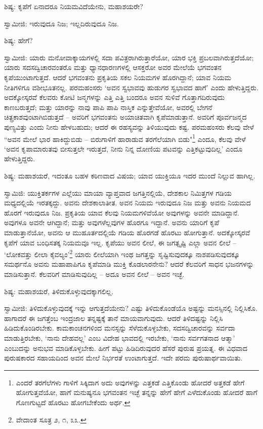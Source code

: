 ಶಿಷ್ಯ: ಕೃಪೆಗೆ ಏನಾದರೂ ನಿಯಮವಿದೆಯೇನು, ಮಹಾಶಯರೇ?

ಸ್ವಾಮೀಜಿ: ಇರುವುದೂ ನಿಜ; ಇಲ್ಲದಿರುವುದೂ ನಿಜ.

ಶಿಷ್ಯ: ಹೇಗೆ?

ಸ್ವಾಮೀಜಿ: ಯಾರು ಮನೋವಾಕ್ಕಾಯಗಳಲ್ಲಿ ಸದಾ ಪವಿತ್ರರಾಗಿರುತ್ತಾರೆಯೋ, ಯಾರ ಭಕ್ತಿ ಪ್ರಬಲವಾಗಿರುತ್ತದೆಯೋ; ಯಾರು ಸದಸದ್ವಿಚಾರವಂತರೊ ಮತ್ತು ಧ್ಯಾನಧಾರಣಗಳಲ್ಲಿ ಆಸಕ್ತರೋ ಅವರ ಮೇಲೆಯೆ ಭಗವಂತನ ಕೃಪೆಯುಂಟಾಗುತ್ತದೆ. ಆದರೆ ಭಗವಂತನು ಪ್ರಕೃತಿಯ ಸಕಲ ನಿಯಮಗಳ ಹೊರಗಿದ್ದಾನೆ; ಯಾವ ನಿಯಮ ನೀತಿಗಳಿಗೂ ವಶೀಭೂತನಲ್ಲ. ಪರಮಹಂಸರು ‘ಅವನ ಸ್ವಭಾವವು ಹುಡುಗರ ಸ್ವಭಾವದ ಹಾಗೆ’ ಎಂದು ಹೇಳುತ್ತಿದ್ದರು. ಅದಕ್ಕೋಸ್ಕರವೆ ಕೆಲವರು ಕೋಟಿ ಜನ್ಮಗಳನ್ನು ಎತ್ತಿ ಎತ್ತಿ ಬಂದರೂ ಅವನ ಸುಳಿವೆ ಗೊತ್ತಾಗದಿರುವುದು ಕಾಣಬರುತ್ತದೆ; ಮತ್ತು ಯಾರನ್ನು ನಾವು ಪಾಪಿ ಪಾಪಿ ನಾಸ್ತಿಕ ಎನ್ನುತ್ತೇವೆಯೋ, ಅವರಲ್ಲಿ ಬೇಗನೆ ಚಿತ್ಪ್ರಕಾಶವುಂಟಾಗಿಬಿಡುತ್ತದೆ – ಅವರಿಗೆ ಭಗವಂತನು ಅಯಾಚಿತವಾಗಿ ಕೃಪೆಮಾಡುತ್ತಾನೆ. ಅವರಿಗೆ ಪೂರ್ವಜನ್ಮದ ಪುಣ್ಯವಿತ್ತು ಎಂದು ನೀನು ಹೇಳಬಹುದು; ಆದರೆ ಈ ರಹಸ್ಯವನ್ನು ತಿಳಿಯುವುದು ಕಷ್ಟ. ಪರಮಹಂಸರು ಕೆಲವು ವೇಳೆ “ಅವನ ಮೇಲೆ ಭಾರ ಹಾಕಿದ್ದುಬಿಡು – ಬಿರುಗಾಳಿಗೆ ಹಾರಾಡುವ ತರಗೆಲೆಯಾಗಿ ಬಿಡು"\footnote{ಎಂದರೆ ತರಗೆಲೆಗಳು ಗಾಳಿಗೆ ಸಿಕ್ಕಿದಾಗ ಅದು ಅವುಗಳನ್ನು ಎತ್ತಕಡೆ ಎತ್ತಿಕೊಂಡು ಹೋದರೆ ಅತ್ತಕಡೆ ಹೇಗೆ ಹೋಗುತ್ತವೆಯೋ, ಹಾಗೆ ಮನುಷ್ಯನೂ ಭಗವಂತನ ಇಚ್ಛೆ ತನ್ನನ್ನು ಹೇಗೆ ಹೇಗೆ ಎಳೆದುಕೊಂಡು ಹೋದರೆ ಹಾಗೆ ಗೊಣಗುಟ್ಟದೆ ಹೊರಟು ಹೋಗಬೇಕೆಂದು ಅರ್ಥ.} ಎಂದೂ, ಕೆಲವು ವೇಳೆ ‘ಅವನ ಕೃಪಾಮಾರುತವು ಬೀಸುತ್ತಲೇ ಇರುತ್ತದೆ, ನೀನು ನಿನ್ನ ದೋಣಿಯ ಪಟವನ್ನು ಎತ್ತಿಕಟ್ಟುವುದಿಲ್ಲ’ ಎಂದೂ ಹೇಳುತ್ತಿದ್ದರು.

ಶಿಷ್ಯ: ಮಹಾಶಯರೆ, ಇದಂತೂ ಬಹಳ ಕಠಿಣವಾದ ವಿಷಯ; ಯಾವ ಯುಕ್ತಿಯೂ ಇದರ ಮುಂದೆ ನಿಲ್ಲುವ ಹಾಗಿಲ್ಲ.

ಸ್ವಾಮಿಜಿ: ಯುಕ್ತಿತರ್ಕಗಳ ಎಲ್ಲೆಯು ಮಾಯಾ ವ್ಯಾಪ್ತವಾದ ಜಗತ್ತಿನಲ್ಲಿಯೆ, ದೇಶಕಾಲ ನಿಮಿತ್ತಗಳ ಗಡಿಯ ಮಧ್ಯದಲ್ಲಿಯೆ ಇರತಕ್ಕದ್ದು. ಅವನು ದೇಶಕಾಲಾತೀತ. ಅವನ ನಿಯಮ ಇರುವುದೂ ನಿಜ ಮತ್ತು ಅವನು ನಿಯಮದ ಹೊರಗೆ ಇರುವುದೂ ನಿಜ. ಪ್ರಕೃತಿಯ ಯಾವ ಕೆಲವು ನಿಯಮಗಳಿವೆಯೋ ಅವುಗಳನ್ನು ಅವನೇ ಮಾಡಿದ್ದಾನೆ. ಅವುಗಳೂ ಅವನೇ ಆಗಿದ್ದಾನೆ; ಮತ್ತು ಅವುಗಳೆಲ್ಲವುಗಳ ಹೊರಗೂ ಇದ್ದಾನೆ. ಅವನು ಯಾರಿಗೆ ಕೃಪೆ ಮಾಡುತ್ತಾನೆಯೋ, ಅವನು ಆ ಮುಹೂರ್ತದಲ್ಲಿಯೆ ಗಡಿಯ ಹೊರಗಡೆ ಹೊರಟು ಹೋಗುತ್ತಾನೆ. ಅದಕ್ಕೋಸ್ಕರವೆ ಕೃಪೆಗೆ ಯಾವ ಬಂಧಿಸತಕ್ಕ ನಿಯಮವೂ ಇಲ್ಲ. ಕೃಪೆಯು ಅವನ ಲೀಲೆ, ಈ ಜಗತ್ಸೃಷ್ಟಿ ಎಲ್ಲಾ ಅವನ ಲೀಲೆ – ‘ಲೋಕವತ್ತು ಲೀಲಾ ಕೈವಲ್ಯಂ’\footnote{ವೇದಾಂತ ಸೂತ್ರ ೨, ೧, ೩೩.} ಯಾರು ಲೀಲೆಯಾಗಿ ಇಂಥ ಜಗತ್ತನ್ನು ಸೃಷ್ಟಿಸುವುದಕ್ಕೂ ನಾಶಪಡಿಸುವುದಕ್ಕೂ ಸಮರ್ಥನೊ ಅವನು ಮಹಾಪಾಪಿಗೂ ಕೃಪೆಮಾಡಿ ಮುಕ್ತಿ ಕೊಡಲಾರನೇನು? ಆದರೆ ಕೆಲವರಿಗೆ ಸಾಧನ ಭಜನಗಳನ್ನು ಮಾಡಿಸುತ್ತಾನೆ. ಕೆಲವರಿಗೆ ಮಾಡಿಸುವುದಿಲ್ಲ – ಅದೂ ಅವನ ಲೀಲೆ – ಅವನ ಇಚ್ಛೆ.

ಶಿಷ್ಯ: ಮಹಾಶಯರೆ, ತಿಳಿದುಕೊಳ್ಳುವುದಕ್ಕಾಗಲಿಲ್ಲ.

ಸ್ವಾಮೀಜಿ: ತಿಳಿದುಕೊಳ್ಳುವುದಕ್ಕೆ ಇನ್ನು ಆಗುತ್ತದೆಯೇನು? ಎಷ್ಟು ತಿಳಿದುಕೊಂಡೆಯೊ ಅಷ್ಟನ್ನು ಮನಸ್ಸಿನಲ್ಲಿ ನಿಲ್ಲಿಸಿಕೊ. ಹಾಗಾದರೆ ಈ ಜಗತ್ತೆಂಬ ಇಂದ್ರಜಾಲ ತನ್ನಷ್ಟಕ್ಕೆ ತಾನೆ ಮಾಯವಾಗುವುದು. ಆದರೆ ತಿಳಿದಷ್ಟನ್ನು ನಿಲ್ಲಿಸಿ ಹಿಡಿದುಕೊಂಡಿರಬೇಕು. ಕಾಮಕಾಂಚನಗಳಿಂದ ಮನಸ್ಸನ್ನು ಸೆಳೆದುಕೊಳ್ಳಬೇಕು, ಸದಸದ್ವಿಚಾರವನ್ನು ಸರ್ವದಾ ಮಾಡುತ್ತಿರಬೇಕು, ‘ನಾನು ದೇಹವಲ್ಲ’ ಎಂಬ ವಿದೇಹ ಭಾವದಲ್ಲಿ ಇರಬೇಕು, ‘ನಾನು ಸರ್ವಗತನಾದ ಆತ್ಮಾ’ ಎಂಬುದನ್ನು ಅನುಭವ ಮಾಡಿಕೊಳ್ಳಬೇಕು. ಹೀಗೆ ಪಟ್ಟು ಹಿಡಿದಿರುವುದರ ಹೆಸರೆ ಪುರುಷ ಪ್ರಯತ್ನ. ಈ ವಿಧವಾದ ಪುರುಷಕಾರದ ಸಹಾಯದಿಂದ ಅವನ ಮೇಲೆ ನಿರ್ಭರತೆ ಉಂಟಾಗುತ್ತದೆ. ಇದೇ ಪರಮ ಪುರುಷಾರ್ಥವಾಯಿತು.

